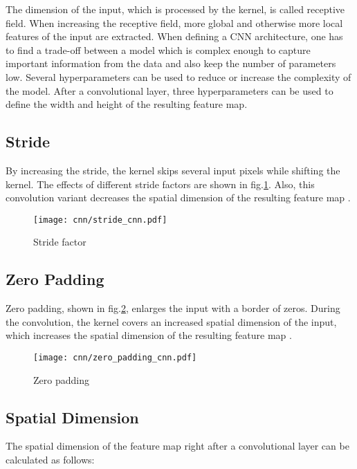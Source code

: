 The dimension of the input, which is processed by the kernel, is called receptive field. When increasing the receptive field, more global and otherwise more local features of the input are extracted. When defining a CNN architecture, one has to find a trade-off between a model which is complex enough to capture important information from the data and also keep the number of parameters low. Several hyperparameters can be used to reduce or increase the complexity of the model. After a convolutional layer, three hyperparameters can be used to define the width and height of the resulting feature map. 


\subsection{Stride}
By increasing the stride, the kernel skips several input pixels while shifting the kernel. The effects of different stride factors are shown in fig.\ref{fig:stride_cnn}. Also, this convolution variant decreases the spatial dimension of the resulting feature map \cite{OShea2015}.

\begin{figure}[H]
  \centering
  \texttt{[image: cnn/stride\_cnn.pdf]}
  \caption {Stride factor}
  \label{fig:stride_cnn}
\end{figure}


\subsection{Zero Padding}
Zero padding, shown in fig.\ref{fig:zero_padding_cnn}, enlarges the input with a border of zeros. During the convolution, the kernel covers an increased spatial dimension of the input, which increases the spatial dimension of the resulting feature map \cite{OShea2015}.

\begin{figure}[H]
  \centering
  \texttt{[image: cnn/zero\_padding\_cnn.pdf]}
  \caption {Zero padding}
  \label{fig:zero_padding_cnn}
\end{figure}



\subsection{Spatial Dimension}

 The spatial dimension of the feature map right after a convolutional layer can be calculated as follows:

